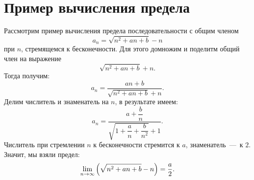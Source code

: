 \documentclass[12pt]{article}
\begin{document}
\section{Пример вычисления предела}
Рассмотрим пример вычисления предела последовательности с общим членом
\begin{equation}
    a_n = \sqrt{n^2 + an + b} - n
\end{equation}
при $n$, стремящемся к бесконечности. Для этого домножим и поделитм общий член на выражение
\begin{equation}
    \sqrt{n^2 + an + b} + n.
\end{equation}
Тогда получим:
\begin{equation}
    a_n = \dfrac{an+b}{\sqrt{n^2 + an + b} + n}.
\end{equation}
Делим числитель и знаменатель на $n$, в результате имеем:
\begin{equation}
    a_n = \dfrac{a+\dfrac{b}{n}}{\sqrt{1 + \dfrac{a}{n} + \dfrac{b}{n^2}} + 1}.
\end{equation}
Числитель при стремлении $n$ к бесконечности стремится к $a$, знаменатель~\----~к $2$. Значит, мы взяли предел:
\begin{equation}
    \lim_{n\rightarrow\infty}\qty(\sqrt{n^2 + an + b} - n) = \dfrac{a}{2}.
\end{equation}
\end{document}
